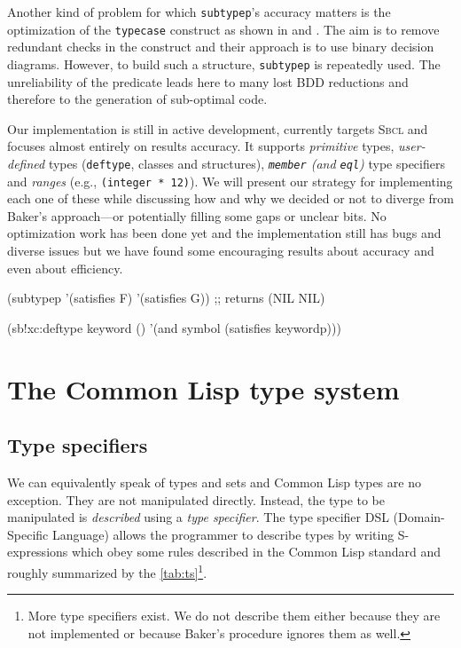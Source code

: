 \documentclass[format=sigconf]{acmart}
\newcommand\code[2][\small]{\sloppy\texttt{#1#2}}
\theoremstyle{definition}
\newcommand\sbcl{\textsc{Sbcl}}
\begin{document}
Another kind of problem for which \code{subtypep}'s accuracy matters is the
optimization of the \code{typecase} construct as shown in \cite{newton.18.phd}
and \cite{newton.18.els}. The aim is to remove redundant checks in the construct
and their approach is to use binary decision diagrams. However, to build such a
structure, \code{subtypep} is repeatedly used. The unreliability of the
predicate leads here to many lost BDD reductions and therefore to the
generation of sub-optimal code.

Our implementation is still in active development, currently targets
\sbcl{} and focuses almost entirely on results accuracy. It supports
\emph{primitive} types, \emph{user-defined} types (\code{deftype}, classes and structures),
\emph{\code{member} (and \code{eql})} type specifiers and \emph{ranges} (e.g.,
\code{(integer * 12)}). We will present our strategy for implementing each one
of these while discussing how and why we decided or not to diverge from Baker's
\cite{baker1992}
approach---or potentially filling some gaps or unclear bits.
No optimization work has been done yet and the implementation still has
bugs and diverse issues but we have found some encouraging results about
accuracy and even about efficiency.

\begin{listing}[!p]
\begin{clcode}
(subtypep '(satisfies F) '(satisfies G))
;; returns (NIL NIL)
\end{clcode}
  \caption{Impossible for \code{subtypep} to answer}
  \label{lst:satisfies}
\end{listing}

\begin{listing}
  \begin{clcode}
(sb!xc:deftype keyword ()
  '(and symbol (satisfies keywordp)))
  \end{clcode}
  \caption{The \code{keyword} type definition in \sbcl}
  \label{lst:keyword}
\end{listing}


\section{The Common Lisp type system}
\subsection{Type specifiers}
We can equivalently speak of types and sets and Common Lisp types are no
exception. They are not manipulated directly. Instead, the type to be
manipulated is \emph{described} using a \emph{type specifier}.
The type specifier DSL (Domain-Specific Language) allows the programmer to
describe types by writing S-expressions which obey some rules described in the
Common Lisp standard \cite{bib:ansi.94.cl} and roughly summarized by the
\vref{tab:ts}\footnote{More type specifiers exist. We do not describe them either
  because they are not implemented or because Baker's procedure ignores them as well.}.
\end{document}
